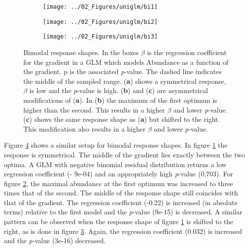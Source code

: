 		
		\begin{figure}[h!]
			
			\begin{subfigure}{0.5\textwidth}
				\centering
				\texttt{[image: ../02\_Figures/uniglm/bi1]}
				\caption{}
				\label{fig:biglm1}
			\end{subfigure}
			\begin{subfigure}{0.5\textwidth}
				\centering
				\texttt{[image: ../02\_Figures/uniglm/bi2]}
				\caption{}
				\label{fig:biglm2}
			\end{subfigure}
			\begin{subfigure}{0.5\textwidth}
				\centering
				\texttt{[image: ../02\_Figures/uniglm/bi3]}
				\caption{}
				\label{fig:biglm3}
			\end{subfigure}
			\caption{
				Bimodal response shapes. 
				In the boxes $\beta$ is the regression coefficient for the gradient in a GLM which models Abundance as a function of the gradient. 
				p is the associated \textit{p}-value. 
				The dashed line indicates the middle of the sampled range.
				(\textbf{a}) shows a symmetrical response, $\beta$ is low and the \textit{p}-value is high. 
				(\textbf{b}) and (\textbf{c}) are asymmetrical modifications of (\textbf{a}). 
				In (\textbf{b}) the maximum of the first optimum is higher than the second. 
				This results in a higher $\beta$ and lower \textit{p}-value. 
				(\textbf{c}) shows the same response shape as (\textbf{a}) but shifted to the right. 
				This modification also results in a higher $\beta$ and lower \textit{p}-value.
			}
			\label{fig:biglm}
		\end{figure}
		
		
		Figure \ref{fig:biglm} shows a similar setup for bimodal response shapes. In figure \ref{fig:biglm1} the response is symmetrical. 
		The middle of the gradient lies exactly between the two optima.
		A GLM with negative binomial residual distribution returns a low regression coefficient (- 9e-04) and an appropriately high \textit{p}-value (0.703).
		For figure \ref{fig:biglm2}, the maximal abundance at the first optimum was increased to three times that of the second.
		The middle of the response shape still coincides with that of the gradient.
		The regression coefficient (-0.22) is increased (in absolute terms) relative to the first model and the \textit{p}-value (9e-15) is decreased. 
		A similar pattern can be observed when the response shape of figure \ref{fig:biglm1} is shifted to the right, as is done in figure \ref{fig:biglm3}.
		Again, the regression coefficient (0.032) is increased and the \textit{p}-value (3e-16) decreased.\\
		
